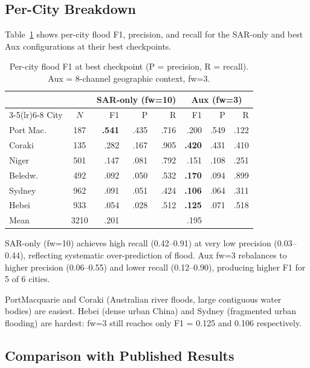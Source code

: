 \documentclass[10pt,twocolumn]{article}
\begin{document}
\subsection{Per-City Breakdown}

Table~\ref{tab:percity} shows per-city flood F1, precision, and recall
for the SAR-only and best Aux configurations at their best checkpoints.

\begin{table}[h]
\centering\small
\setlength{\tabcolsep}{4pt}
\caption{Per-city flood F1 at best checkpoint (P = precision, R = recall).
  Aux = 8-channel geographic context, fw=3.}
\label{tab:percity}
\begin{tabular}{lc rrr rrr}
\toprule
 & & \multicolumn{3}{c}{SAR-only (fw=10)} & \multicolumn{3}{c}{Aux (fw=3)} \\
\cmidrule(lr){3-5}\cmidrule(lr){6-8}
City & $N$ & F1 & P & R & F1 & P & R \\
\midrule
Port Mac. & 187 & \textbf{.541} & .435 & .716 & .200 & .549 & .122 \\
Coraki    & 135 & .282 & .167 & .905 & \textbf{.420} & .431 & .410 \\
Niger     & 501 & .147 & .081 & .792 & .151 & .108 & .251 \\
Beledw.   & 492 & .092 & .050 & .532 & \textbf{.170} & .094 & .899 \\
Sydney    & 962 & .091 & .051 & .424 & \textbf{.106} & .064 & .311 \\
Hebei     & 933 & .054 & .028 & .512 & \textbf{.125} & .071 & .518 \\
\midrule
Mean      &3210 & .201 & & & .195 & & \\
\bottomrule
\end{tabular}
\end{table}

SAR-only (fw=10) achieves high recall (0.42--0.91) at very low
precision (0.03--0.44), reflecting systematic over-prediction of flood.
Aux fw=3 rebalances to higher precision (0.06--0.55) and lower recall
(0.12--0.90), producing higher F1 for 5 of 6 cities.

PortMacquarie and Coraki (Australian river floods, large contiguous
water bodies) are easiest.  Hebei (dense urban China) and Sydney
(fragmented urban flooding) are hardest: fw=3 still reaches only
F1 = 0.125 and 0.106 respectively.

\subsection{Comparison with Published Results}
\end{document}
